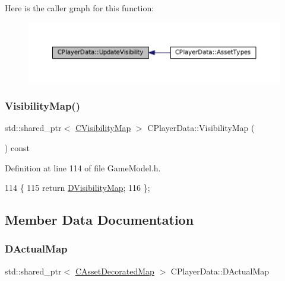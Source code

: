 Here is the caller graph for this function\+:\nopagebreak
\begin{figure}[H]
\begin{center}
\leavevmode
\includegraphics[width=350pt]{classCPlayerData_a3ac1393306e8a3f7c95d13ca01e429a7_icgraph}
\end{center}
\end{figure}
\hypertarget{classCPlayerData_af263bd5a4864d98570d5a8a3f7986cdd}{}\label{classCPlayerData_af263bd5a4864d98570d5a8a3f7986cdd} 
\subsubsection{\texorpdfstring{Visibility\+Map()}{VisibilityMap()}}
{\footnotesize\ttfamily std\+::shared\+\_\+ptr$<$ \hyperlink{classCVisibilityMap}{C\+Visibility\+Map} $>$ C\+Player\+Data\+::\+Visibility\+Map (\begin{DoxyParamCaption}{ }\end{DoxyParamCaption}) const\hspace{0.3cm}{\ttfamily [inline]}}



Definition at line 114 of file Game\+Model.\+h.


\begin{DoxyCode}
114                                                              \{
115             \textcolor{keywordflow}{return} \hyperlink{classCPlayerData_a804ea65e7ec7c90b2e335414d106cc78}{DVisibilityMap};  
116         \};
\end{DoxyCode}


\subsection{Member Data Documentation}
\hypertarget{classCPlayerData_a943801106af1d7ad52abd73d32552186}{}\label{classCPlayerData_a943801106af1d7ad52abd73d32552186} 
\subsubsection{\texorpdfstring{D\+Actual\+Map}{DActualMap}}
{\footnotesize\ttfamily std\+::shared\+\_\+ptr$<$ \hyperlink{classCAssetDecoratedMap}{C\+Asset\+Decorated\+Map} $>$ C\+Player\+Data\+::\+D\+Actual\+Map\hspace{0.3cm}{\ttfamily [protected]}}



